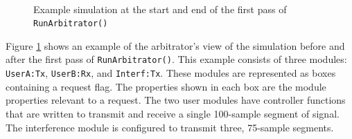 \begin{figure}[!h]
\centering \mbox{
     \quad
} \caption[Arbitrator Example: Loop 1]{Example simulation at the
start and end of the first pass of \tt{RunArbitrator()}}
\label{fig:arbitEx1}
\end{figure}

Figure \ref{fig:arbitEx1} shows an example of the arbitrator's view
of the simulation before and after the first pass of
\verb+RunArbitrator()+.  This example consists of three modules:
\verb+UserA:Tx+, \verb+UserB:Rx+, and \verb+Interf:Tx+.  These
modules are represented as boxes containing a request flag.  The
properties shown in each box are the module properties relevant to a
request.  The two user modules have controller functions that are
written to transmit and receive a single 100-sample segment of
signal.  The interference module is configured to transmit three,
75-sample segments.

